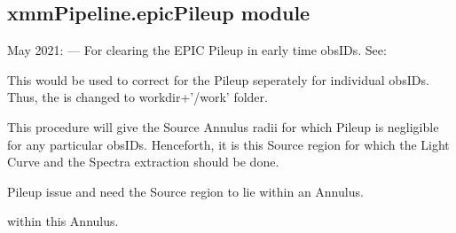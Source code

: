 \documentclass[letterpaper,10pt,english]{sphinxmanual}
\begin{document}

\begin{fulllineitems}
\label{\detokenize{xmmPipeline:xmmPipeline.epicObj.strToBool}}
\pysigstartsignatures
{}
\pysigstopsignatures
\end{fulllineitems}



\subsection{xmmPipeline.epicPileup module}
\label{\detokenize{xmmPipeline:module-xmmPipeline.epicPileup}}\label{\detokenize{xmmPipeline:xmmpipeline-epicpileup-module}}
 May 2021:
—
For clearing the EPIC Pile\sphinxhyphen{}up in early time obsIDs.
See: 

\sphinxAtStartPar
This would be used to correct for the Pile\sphinxhyphen{}up seperately for individual
obsIDs. Thus, the  is changed to {\color{red}\bfseries{}\textasciigrave{}}workdir\textasciigrave{}+’/work’ folder.

\sphinxAtStartPar
This procedure will give the Source Annulus radii for which Pile\sphinxhyphen{}up is
negligible for any particular obsIDs. Henceforth, it is this Source region
for which the Light Curve and the Spectra extraction should be done.
\begin{description}
\begin{description}
\sphinxAtStartPar
Pile\sphinxhyphen{}up issue and need the Source region to lie within an Annulus.

\sphinxAtStartPar
within this Annulus.

\end{description}

\end{description}
\end{document}
